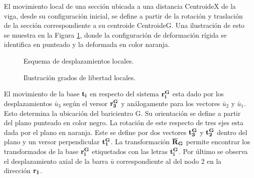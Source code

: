 El movimiento local de una sección ubicada a una distancia \gls{CentroideX} de la viga, desde su configuración inicial, se define a partir de la rotación y traslación de la sección correspondiente a su centroide \gls{CentroideG}. Una ilustración de esto se muestra en la Figura \ref{fig:PRE:IlusLocalDisp}, donde la configuración de deformación rígida se identifica en punteado y la deformada en color naranja.



\begin{figure}[htbp]
	\centering
	\def\svgwidth{100mm}
	
	\caption{Esquema de desplazamientos locales.}
	\label{fig:PRE:IlusLocalDisp}
\end{figure}

\begin{figure}[htbp]
	\centering
	\def\svgwidth{100mm}
 	
	\caption{Ilustración grados de libertad locales.}
	\label{fig:PRE:IlusLocalAng}
\end{figure}




El movimiento de la base $\bf{t_i}$ en respecto del sistema $\bf{r_i^G}$ esta dado por los desplazamientos  $\bar{u}_3$ según el versor  $\bf{r_3^G}$ y análogamente para los vectores $\bar{u}_2$ y $\bar{u}_1$. Esto determina la ubicación del baricientro G. Su orientación se define a partir del plano punteado en color negro. La rotación de este respecto de tres ejes esta dada por el plano en naranja. Este se define por dos vectores $\bf{t_3^G}$ y $\bf{t_2^G}$ dentro del plano y un versor perpendicular $\bf{t_1^G}$. La transformación $\bf{\overline{R}}_G$ permite encontrar  los transformados de la base $\bf{r_i^G}$ etiquetados con las letras $\bf{t_i^G}$. Por último se observa el desplazamiento axial de la barra $\bar{u}$ correspondiente al del nodo 2 en la dirección $\bf{r_1}$.

